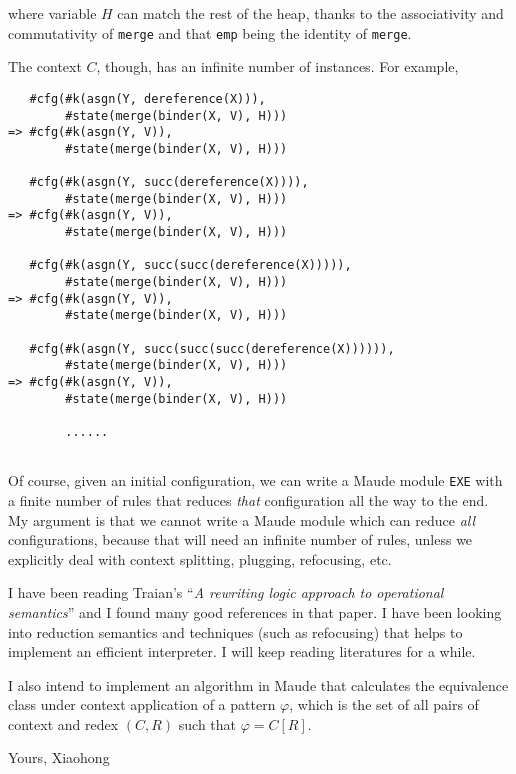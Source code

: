 \documentclass{article}
\begin{document}
\noindent where variable $H$ can match the rest of the heap, thanks to the associativity and commutativity of \texttt{merge} and that \texttt{emp} being the identity of \texttt{merge}.

The context $C$, though, has an infinite number of instances. For example,

\lstset{style=code}

\begin{lstlisting}
   #cfg(#k(asgn(Y, dereference(X))), 
        #state(merge(binder(X, V), H)))
=> #cfg(#k(asgn(Y, V)), 
        #state(merge(binder(X, V), H)))
        
   #cfg(#k(asgn(Y, succ(dereference(X)))), 
        #state(merge(binder(X, V), H)))
=> #cfg(#k(asgn(Y, V)), 
        #state(merge(binder(X, V), H)))
        
   #cfg(#k(asgn(Y, succ(succ(dereference(X))))), 
        #state(merge(binder(X, V), H)))
=> #cfg(#k(asgn(Y, V)), 
        #state(merge(binder(X, V), H)))
        
   #cfg(#k(asgn(Y, succ(succ(succ(dereference(X)))))), 
        #state(merge(binder(X, V), H)))
=> #cfg(#k(asgn(Y, V)), 
        #state(merge(binder(X, V), H)))
        
        ......
        
\end{lstlisting}

Of course, given an initial configuration, we can write a Maude module \texttt{EXE} with a finite number of rules that reduces \emph{that} configuration all the way to the end. My argument is that we cannot write a Maude module which can reduce \emph{all} configurations, because that will need an infinite number of rules, unless we explicitly deal with context splitting, plugging, refocusing, etc.

I have been reading Traian's ``\emph{A rewriting logic approach to operational semantics}'' and I found many good references in that paper. I have been looking into reduction semantics and techniques (such as refocusing) that helps to implement an efficient interpreter. I will keep reading literatures for a while.

I also intend to implement an algorithm in Maude that calculates the equivalence class under context application of a pattern $\varphi$, which is the set of all pairs of context and redex $(C, R)$ such that $\varphi = C[R]$.

\noindent Yours, \newline
\noindent Xiaohong
        
\end{document}
